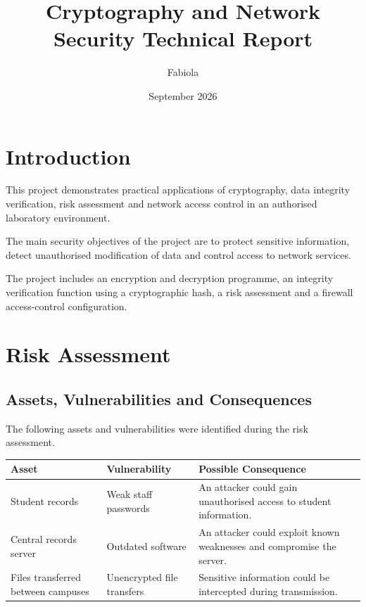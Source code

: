 \documentclass[12pt,a4paper]{article}
\title{\textbf{Cryptography and Network Security Technical Report}}
\author{Fabiola}
\date{September 2026}
\begin{document}
\maketitle

\tableofcontents
\newpage

\section{Introduction}

This project demonstrates practical applications of cryptography, data
integrity verification, risk assessment and network access control in an
authorised laboratory environment.

The main security objectives of the project are to protect sensitive
information, detect unauthorised modification of data and control access
to network services.

The project includes an encryption and decryption programme, an integrity
verification function using a cryptographic hash, a risk assessment and
a firewall access-control configuration.

\section{Risk Assessment}

\subsection{Assets, Vulnerabilities and Consequences}

The following assets and vulnerabilities were identified during the risk
assessment.

\begin{longtable}{p{} p{} p{}}
\toprule
\textbf{Asset} & \textbf{Vulnerability} & \textbf{Possible Consequence} \\
\midrule
Student records &
Weak staff passwords &
An attacker could gain unauthorised access to student information. \\

Central records server &
Outdated software &
An attacker could exploit known weaknesses and compromise the server. \\

Files transferred between campuses &
Unencrypted file transfers &
Sensitive information could be intercepted during transmission. \\
\bottomrule
\end{longtable}
\end{document}
